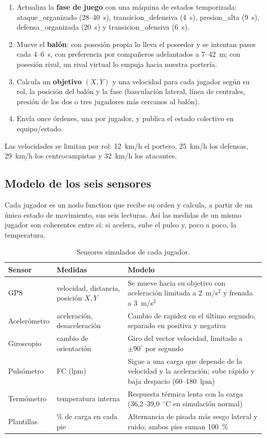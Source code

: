 \documentclass[runningheads]{llncs}
\begin{document}
\begin{enumerate}
  \item Actualiza la \textbf{fase de juego} con una máquina de estados temporizada: ataque\_organizado (28--40~s), transicion\_defensiva (4~s), presion\_alta (9~s), defensa\_organizada (20~s) y transicion\_ofensiva (6~s).
  \item Mueve el \textbf{balón}: con posesión propia lo lleva el poseedor y se intentan pases cada 4--6~s, con preferencia por compañeros adelantados a 7--42~m; con posesión rival, un rival virtual lo empuja hacia nuestra portería.
  \item Calcula un \textbf{objetivo} $(X,Y)$ y una velocidad para cada jugador según su rol, la posición del balón y la fase (basculación lateral, línea de centrales, presión de los dos o tres jugadores más cercanos al balón).
  \item Envía once órdenes, una por jugador, y publica el estado colectivo en equipo/estado.
\end{enumerate}

Las velocidades se limitan por rol: 12~km/h el portero, 25~km/h los defensas, 29~km/h los centrocampistas y 32~km/h los atacantes.

\subsection{Modelo de los seis sensores}

Cada jugador es un nodo function que recibe su orden y calcula, a partir de un único estado de movimiento, sus seis lecturas. Así las medidas de un mismo jugador son coherentes entre sí: si acelera, sube el pulso y, poco a poco, la temperatura.

\begin{table}[!htbp]
\centering
\caption{Sensores simulados de cada jugador.}\label{tab:sensores}
\footnotesize
\begin{tabularx}{\textwidth}{p{2.3cm}p{3.6cm}L}
\toprule
\textbf{Sensor} & \textbf{Medidas} & \textbf{Modelo} \\
\midrule
GPS & velocidad, distancia, posición $X,Y$ & Se mueve hacia su objetivo con aceleración limitada a 2~m/s$^2$ y frenada a 3~m/s$^2$ \\
Acelerómetro & aceleración, desaceleración & Cambio de rapidez en el último segundo, separado en positiva y negativa \\
Giroscopio & cambio de orientación & Giro del vector velocidad, limitado a $\pm90^\circ$ por segundo \\
Pulsómetro & FC (lpm) & Sigue a una carga que depende de la velocidad y la aceleración; sube rápido y baja despacio (60--180~lpm) \\
Termómetro & temperatura interna & Respuesta térmica lenta con la carga (36,2--39,0~$^\circ$C en simulación normal) \\
Plantillas & \% de carga en cada pie & Alternancia de pisada más sesgo lateral y ruido; ambos pies suman 100~\% \\
\bottomrule
\end{tabularx}
\end{table}
\end{document}
